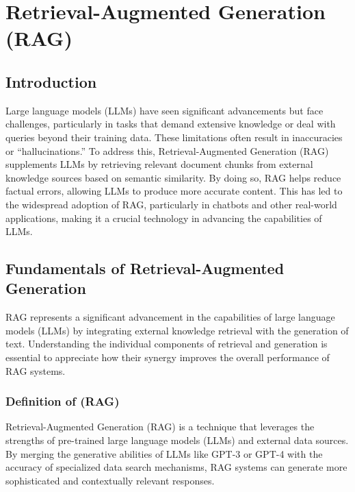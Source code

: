 \chapter{Retrieval-Augmented Generation (RAG)}
\pagestyle{fancy}
\pagestyle{fancy}\chead{} \pagestyle{fancy}\rhead{}
\pagestyle{fancy} 
\pagestyle{fancy}\cfoot{} \pagestyle{fancy}\rfoot{\thepage}
\section{Introduction}\label{start 1}

Large language models (LLMs) have seen significant advancements but face challenges, particularly in tasks that demand extensive knowledge or deal with queries beyond their training data. These limitations often result in inaccuracies or “hallucinations.” To address this, Retrieval-Augmented Generation (RAG) supplements LLMs by retrieving relevant document chunks from external knowledge sources based on semantic similarity. By doing so, RAG helps reduce factual errors, allowing LLMs to produce more accurate content. This has led to the widespread adoption of RAG, particularly in chatbots and other real-world applications, making it a crucial technology in advancing the capabilities of LLMs.
\section{Fundamentals of Retrieval-Augmented Generation}
RAG represents a significant advancement in the capabilities of large language models (LLMs) by integrating external knowledge retrieval with the generation of text. Understanding the individual components of retrieval and generation is essential to appreciate how their synergy improves the overall performance of RAG systems.
\subsection{Definition of (RAG)}
Retrieval-Augmented Generation (RAG) is a technique that leverages the strengths of pre-trained large language models (LLMs) and external data sources. By merging the generative abilities of LLMs like GPT-3 or GPT-4 with the accuracy of specialized data search mechanisms, RAG systems can generate more sophisticated and contextually relevant responses\cite{selvaraj2024}.
